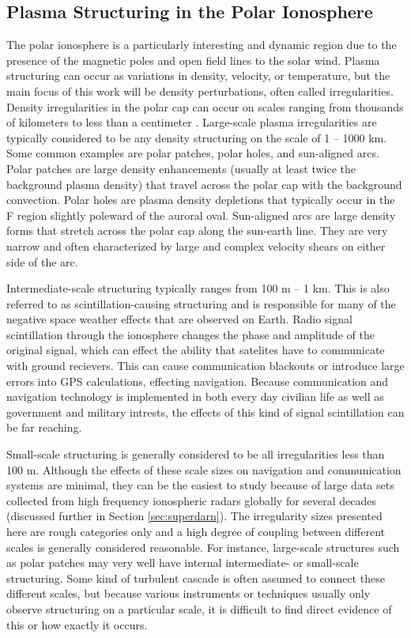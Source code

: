 \subsection{Plasma Structuring in the Polar Ionosphere}
\label{sec:polar_structure}
The polar ionosphere is a particularly interesting and dynamic region due to the presence of the magnetic poles and open field lines to the solar wind.  Plasma structuring can occur as variations in density, velocity, or temperature, but the main focus of this work will be density perturbations, often called irregularities.  Density irregularities in the polar cap can occur on scales ranging from thousands of kilometers to less than a centimeter \citep{Tsunoda1988}.  Large-scale plasma irregularities are typically considered to be any density structuring on the scale of 1 -- 1000 km.  Some common examples are polar patches, polar holes, and sun-aligned arcs.  Polar patches are large density enhancements (usually at least twice the background plasma density) that travel across the polar cap with the background convection.  Polar holes are plasma density depletions that typically occur in the F region slightly poleward of the auroral oval.  Sun-aligned arcs are large density forms that stretch across the polar cap along the sun-earth line.  They are very narrow and often characterized by large and complex velocity shears on either side of the arc.

Intermediate-scale structuring typically ranges from 100 m -- 1 km.  This is also referred to as scintillation-causing structuring and is responsible for many of the negative space weather effects that are observed on Earth.  Radio signal scintillation through the ionosphere changes the phase and amplitude of the original signal, which can effect the ability that satelites have to communicate with ground recievers.  This can cause communication blackouts or introduce large errors into GPS calculations, effecting navigation.  Because communication and navigation technology is implemented in both every day civilian life as well as government and military intrests, the effects of this kind of signal scintillation can be far reaching.

Small-scale structuring is generally considered to be all irregularities less than 100 m.  Although the effects of these scale sizes on navigation and communication systems are minimal, they can be the easiest to study because of large data sets collected from high frequency ionospheric radars globally for several decades (discussed further in Section \ref{sec:superdarn}).  The irregularity sizes presented here are rough categories only and a high degree of coupling between different scales is generally considered reasonable.  For instance, large-scale structures such as polar patches may very well have internal intermediate- or small-scale structuring.  Some kind of turbulent cascade is often assumed to connect these different scales, but because various instruments or techniques usually only observe structuring on a particular scale, it is difficult to find direct evidence of this or how exactly it occurs.

